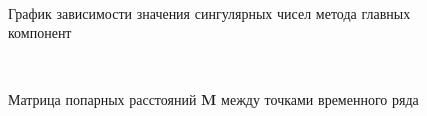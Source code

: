 \documentclass[12pt, twoside]{article}
\begin{document}
\begin{figure}[h!t]\center
{}
\\
\caption{График зависимости значения сингулярных чисел метода главных компонент}
\label{fig_synthetic_lambda}
\end{figure}

\begin{figure}[h!t]\center
{}
\\
\caption{Матрица попарных расстояний $\textbf{M}$ между точками временного ряда}
\label{fig_synthetic_distance}
\end{figure}
\end{document}
